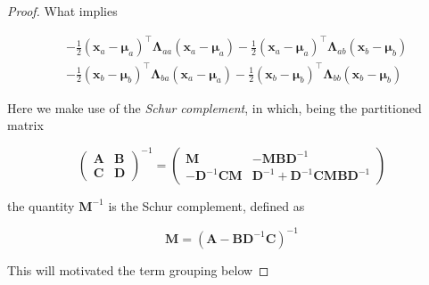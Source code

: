 \begin{appendices}
\begin{proof}
    What implies

    \begin{equation}
    \begin{aligned} &-\frac{1}{2}\left(\mathbf{x}_{a}-\boldsymbol{\mu}_{a}\right)^\top \boldsymbol{\Lambda}_{a a}\left(\mathbf{x}_{a}-\boldsymbol{\mu}_{a}\right)-\frac{1}{2}\left(\mathbf{x}_{a}-\boldsymbol{\mu}_{a}\right)^\top \boldsymbol{\Lambda}_{a b}\left(\mathbf{x}_{b}-\boldsymbol{\mu}_{b}\right) \\ &-\frac{1}{2}\left(\mathbf{x}_{b}-\boldsymbol{\mu}_{b}\right)^\top \boldsymbol{\Lambda}_{b a}\left(\mathbf{x}_{a}-\boldsymbol{\mu}_{a}\right)-\frac{1}{2}\left(\mathbf{x}_{b}-\boldsymbol{\mu}_{b}\right)^\top \boldsymbol{\Lambda}_{b b}\left(\mathbf{x}_{b}-\boldsymbol{\mu}_{b}\right) 
    \end{aligned}
    \end{equation}

    Here we make use of the \textit{Schur complement}, in which, being the partitioned matrix

    \begin{equation}
    \left(\begin{array}{cc}{\mathbf{A}} & {\mathbf{B}} \\ {\mathbf{C}} & {\mathbf{D}}\end{array}\right)^{-1}=\left(\begin{array}{cc}{\mathbf{M}} & {-\mathbf{M B D}^{-1}} \\ {-\mathbf{D}^{-1} \mathbf{C M}} & {\mathbf{D}^{-1}+\mathbf{D}^{-1} \mathbf{C M B D}^{-1}}\end{array}\right)
    \end{equation}

    the quantity $\mathbf{M}^{-1}$ is the Schur complement, defined as 

    \begin{equation}
      \label{eq:app-par-gau-schur}
      \mathbf{M}=\left(\mathbf{A}-\mathbf{B D}^{-1} \mathbf{C}\right)^{-1}  
    \end{equation}

    This will motivated the term grouping below


\end{proof}
\end{appendices}
